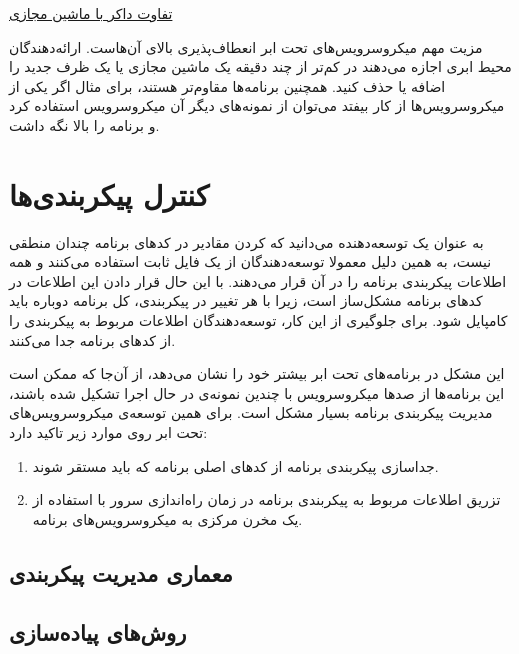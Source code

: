 \documentclass[a4paper,12pt]{book}
\begin{document}
\href{https://nickjanetakis.com/blog/comparing-virtual-machines-vs-docker-containers}
{ تفاوت داکر با ماشین مجازی}

\vskip 0.5cm
مزیت مهم میکروسرویس‌های تحت ابر انعطاف‌پذیری بالای آن‌هاست. ارائه‌دهندگان محیط ابری اجازه می‌دهند در کم‌تر از چند دقیقه یک ماشین مجازی یا یک ظرف جدید را اضافه یا حذف کنید. همچنین برنامه‌ها مقاوم‌تر هستند، برای مثال اگر یکی از میکروسرویس‌ها از کار بیفتد می‌توان از نمونه‌های دیگر آن میکروسرویس استفاده کرد و برنامه را بالا نگه داشت. 











\chapter{کنترل پیکربندی‌ها}
به عنوان یک توسعه‌دهنده می‌دانید که
کردن مقادیر در کدهای برنامه چندان منطقی نیست، به همین دلیل معمولا توسعه‌دهندگان از یک فایل ثابت استفاده می‌کنند و همه اطلاعات پیکربندی برنامه را در آن قرار می‌دهند. با این حال قرار دادن این اطلاعات در کدهای برنامه مشکل‌ساز است، زیرا با هر تغییر در پیکربندی، کل برنامه دوباره باید کامپایل شود. برای جلوگیری از این کار، توسعه‌دهندگان اطلاعات مربوط به پیکربندی را از کدهای برنامه جدا می‌کنند. 

این مشکل در برنامه‌های تحت ابر بیشتر خود را نشان می‌دهد، از آن‌جا که ممکن است این برنامه‌ها از صدها میکروسرویس با چندین نمونه‌ی در حال اجرا تشکیل شده باشند، مدیریت پیکربندی برنامه بسیار مشکل است. برای همین توسعه‌ی میکروسرویس‌های تحت ابر روی موارد زیر تاکید دارد:
\begin{enumerate}
	\item جداسازی پیکربندی برنامه از کدهای اصلی برنامه که باید مستقر شوند.
	\item تزریق اطلاعات مربوط به پیکربندی برنامه در زمان راه‌اندازی سرور با استفاده از یک مخرن مرکزی به میکروسرویس‌‌های برنامه.
\end{enumerate}


\section{معماری مدیریت پیکربندی}


\section{روش‌های پیاده‌سازی}


\begin{tcolorbox}[colback=red!5!white,colframe=red!75!black]
	
\end{tcolorbox}
\end{document}
